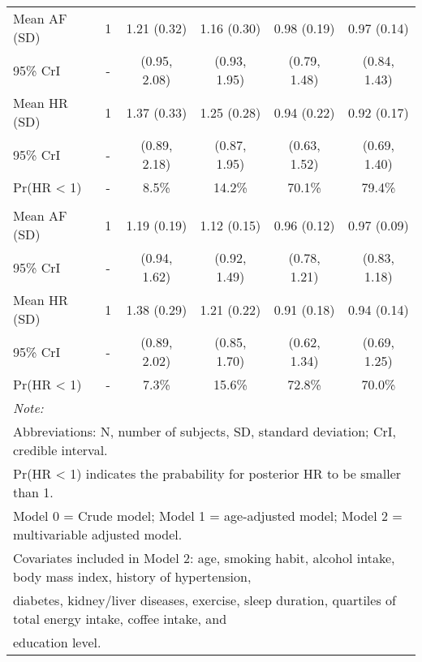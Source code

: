 \documentclass[nutrients,article,submitted,moreauthors,pdftex]{mdpi}
\begin{document}
\begin{table}[H]
{\begin{tabular}[t]{lccccc}
\rowcolor{gray!6}  \hspace{1em}Mean AF (SD) & 1 & 1.21 (0.32) & 1.16 (0.30) & 0.98 (0.19) & 0.97 (0.14)\\
\hspace{1em}95\% CrI & - & (0.95, 2.08) & (0.93, 1.95) & (0.79, 1.48) & (0.84, 1.43)\\
\rowcolor{gray!6}  \hspace{1em}Mean HR (SD) & 1 & 1.37 (0.33) & 1.25 (0.28) & 0.94 (0.22) & 0.92 (0.17)\\
\hspace{1em}95\% CrI & - & (0.89, 2.18) & (0.87, 1.95) & (0.63, 1.52) & (0.69, 1.40)\\
\rowcolor{gray!6}  \hspace{1em}Pr(HR < 1) & - & 8.5\% & 14.2\% & 70.1\% & 79.4\%\\
\addlinespace[0.3em]
\multicolumn{6}{l}{\textbf{Model 2}}\\
\hspace{1em}Mean AF (SD) & 1 & 1.19 (0.19) & 1.12 (0.15) & 0.96 (0.12) & 0.97 (0.09)\\
\rowcolor{gray!6}  \hspace{1em}95\% CrI & - & (0.94, 1.62) & (0.92, 1.49) & (0.78, 1.21) & (0.83, 1.18)\\
\hspace{1em}Mean HR (SD) & 1 & 1.38 (0.29) & 1.21 (0.22) & 0.91 (0.18) & 0.94 (0.14)\\
\rowcolor{gray!6}  \hspace{1em}95\% CrI & - & (0.89, 2.02) & (0.85, 1.70) & (0.62, 1.34) & (0.69, 1.25)\\
\hspace{1em}Pr(HR < 1) & - & 7.3\% & 15.6\% & 72.8\% & 70.0\%\\
\bottomrule
\multicolumn{6}{l}{\textit{Note: }}\\
\multicolumn{6}{l}{Abbreviations: N, number of subjects, SD, standard deviation; CrI, credible interval.}\\
\multicolumn{6}{l}{ Pr(HR < 1) indicates the prabability for posterior HR to be smaller than 1.}\\
\multicolumn{6}{l}{Model 0 = Crude model; Model 1 = age-adjusted model; Model 2 = multivariable adjusted model.}\\
\multicolumn{6}{l}{Covariates included in Model 2: age, smoking habit, alcohol intake, body mass index, history of hypertension, }\\
\multicolumn{6}{l}{diabetes, kidney/liver diseases, exercise, sleep duration,  quartiles of total energy intake, coffee intake, and }\\
\multicolumn{6}{l}{education level.}\\
\end{tabular}}
\end{table}
\end{document}
